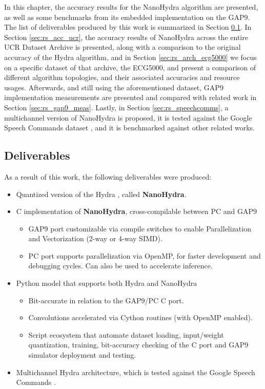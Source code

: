 In this chapter, the accuracy results for the NanoHydra algorithm are presented, as well as some benchmarks from its embedded implementation on the GAP9.
The list of deliverables produced by this work is summarized in Section \ref{sec:rs_deliv}. In Section \ref{sec:rs_acc_ucr}, the accuracy results of NanoHydra
across the entire UCR Dataset Archive is presented, along with a comparison to the original accuracy of the Hydra algorithm, and in Section \ref{sec:rs_arch_ecg5000}
we focus on a specific dataset of that archive, the ECG5000, and present a comparison of different algorithm topologies, and their associated accuracies and 
resource usages. Afterwards, and still using the aforementioned dataset, GAP9 implementation measurements are presented and compared with related work in Section \ref{sec:rs_gap9_meas}. 
Lastly, in Section \ref{sec:rs_speechcomms}, a multichannel version of NanoHydra is proposed, it is tested against the Google Speech Commands dataset \cite{Warden2018}, and it is
benchmarked against other related works.

\subsection{Deliverables}\label{sec:rs_deliv}
As a result of this work, the following deliverables were produced:

\begin{itemize}
    \item Quantized version of the Hydra \cite{Dempster2023Hydra}, called \textbf{NanoHydra}.
    \item C implementation of \textbf{NanoHydra}, cross-compilable between PC and GAP9
        \begin{itemize}
            \item GAP9 port customizable via compile switches to enable Parallelization and Vectorization (2-way or 4-way SIMD).
            \item PC port supports parallelization via OpenMP, for faster development and debugging cycles. Can also be used to accelerate inference.
        \end{itemize}
    \item Python model that supports both Hydra and NanoHydra
        \begin{itemize}
            \item Bit-accurate in relation to the GAP9/PC C port.
            \item Convolutions accelerated via Cython routines (with OpenMP enabled).
            \item Script ecosystem that automate dataset loading, input/weight quantization, training, bit-accuracy checking of the C port and GAP9 simulator deployment and testing.
        \end{itemize}
    \item Multichannel Hydra architecture, which is tested against the Google Speech Commands \cite{Warden2018}.
\end{itemize}

